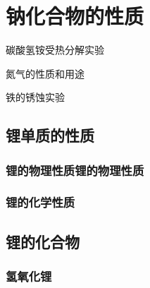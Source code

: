 \documentclass[color=orange,openany]{textbook-cn}
\begin{document}
\begin{Exercise}
\begin{QsNum}
\item \lipsum[1][1-2]
\item \lipsum[1][1-2]
\item \lipsum[1][1-2]
\item \lipsum[1][1-2]
\item \lipsum[1][1-2]
\item \lipsum[1][1-2]
\item \lipsum[1][1-2]
\item \lipsum[1][1-2]
\end{QsNum}
\tcblower
\lipsum[1]
\end{Exercise}



\section{钠化合物的性质}
\begin{Point}
\lipsum[2]
\end{Point}

\begin{Case}
\item 碳酸氢铵受热分解实验
\item 氮气的性质和用途
\item 铁的锈蚀实验
\end{Case}


\subsection{锂单质的性质}
\subsubsection{锂的物理性质锂的物理性质}
\lipsum[1-2]

\begin{Lemma*}[万有引力定律]
\lipsum[2][1-3]
\end{Lemma*}
\subsubsection{锂的化学性质}
\lipsum[1-2]
\subsection{锂的化合物}
\lipsum[3]
\subsubsection{氢氧化锂}
\lipsum[1-2]
\end{document}
